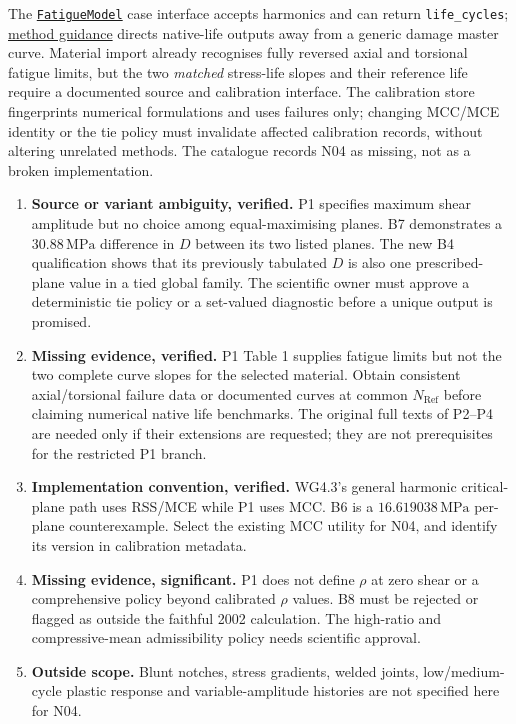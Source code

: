 \documentclass[10pt,a4paper]{article}
\newcommand{\sct}[1]{\needspace{5\baselineskip}\vspace{7pt}{\large\bfseries\color{ink}#1}\par\vspace{2pt}}
\newcommand{\MPa}{\,\mathrm{MPa}}
\begin{document}
The \href{https://github.com/andreachiocca/multiaxial-fatigue/blob/1ffb8896d1447e9f9f40f37f0c8c7dd08a563251/fatigue/models/base.py}{\texttt{FatigueModel}} case interface accepts harmonics and can return \texttt{life\_cycles}; \href{https://github.com/andreachiocca/multiaxial-fatigue/blob/1ffb8896d1447e9f9f40f37f0c8c7dd08a563251/docs/adding-methods.md}{method guidance} directs native-life outputs away from a generic damage master curve. Material import already recognises fully reversed axial and torsional fatigue limits, but the two \emph{matched} stress-life slopes and their reference life require a documented source and calibration interface. The calibration store fingerprints numerical formulations and uses failures only; changing MCC/MCE identity or the tie policy must invalidate affected calibration records, without altering unrelated methods. The catalogue records N04 as missing, not as a broken implementation.

\sct{G  Evidence gaps and discrepancy log}\label{sec:gaps}
\begin{enumerate}
\item \textbf{Source or variant ambiguity, verified.} P1 specifies maximum shear amplitude but no choice among equal-maximising planes. B7 demonstrates a $30.88\MPa$ difference in $D$ between its two listed planes. The new B4 qualification shows that its previously tabulated $D$ is also one prescribed-plane value in a tied global family. The scientific owner must approve a deterministic tie policy or a set-valued diagnostic before a unique output is promised.
\item \textbf{Missing evidence, verified.} P1 Table 1 supplies fatigue limits but not the two complete curve slopes for the selected material. Obtain consistent axial/torsional failure data or documented curves at common $N_{\mathrm{Ref}}$ before claiming numerical native life benchmarks. The original full texts of P2--P4 are needed only if their extensions are requested; they are not prerequisites for the restricted P1 branch.
\item \textbf{Implementation convention, verified.} WG4.3's general harmonic critical-plane path uses RSS/MCE while P1 uses MCC. B6 is a $16.619038\MPa$ per-plane counterexample. Select the existing MCC utility for N04, and identify its version in calibration metadata.
\item \textbf{Missing evidence, significant.} P1 does not define $\rho$ at zero shear or a comprehensive policy beyond calibrated $\rho$ values. B8 must be rejected or flagged as outside the faithful 2002 calculation. The high-ratio and compressive-mean admissibility policy needs scientific approval.
\item \textbf{Outside scope.} Blunt notches, stress gradients, welded joints, low/medium-cycle plastic response and variable-amplitude histories are not specified here for N04.
\end{enumerate}
\end{document}

